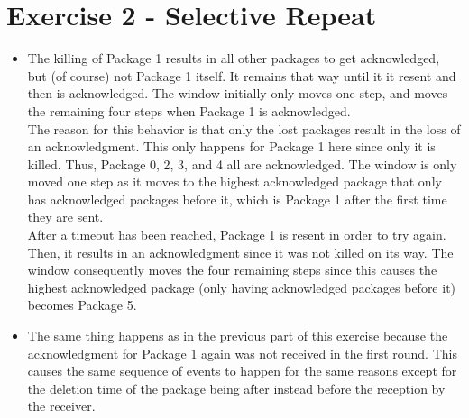 \documentclass[10pt]{article}
\begin{document}
\section{Exercise 2 - Selective Repeat}
\begin{itemize}
  \item The killing of Package 1 results in all other packages to get acknowledged, but (of course) not Package 1 itself. It remains that way until it it resent and then is acknowledged. The window initially only moves one step, and moves the remaining four steps when Package 1 is acknowledged. \\

  The reason for this behavior is that only the lost packages result in the loss of an acknowledgment. This only happens for Package 1 here since only it is killed. Thus, Package 0, 2, 3, and 4 all are acknowledged. The window is only moved one step as it moves to the highest acknowledged package that only has acknowledged packages before it, which is Package 1 after the first time they are sent. \\
  
  After a timeout has been reached, Package 1 is resent in order to try again. Then, it results in an acknowledgment since it was not killed on its way. The window consequently moves the four remaining steps since this causes the highest acknowledged package (only having acknowledged packages before it) becomes Package 5.
  \item The same thing happens as in the previous part of this exercise because the acknowledgment for Package 1 again was not received in the first round. This causes the same sequence of events to happen for the same reasons except for the deletion time of the package being after instead before the reception by the receiver.
\end{itemize}
\end{document}
